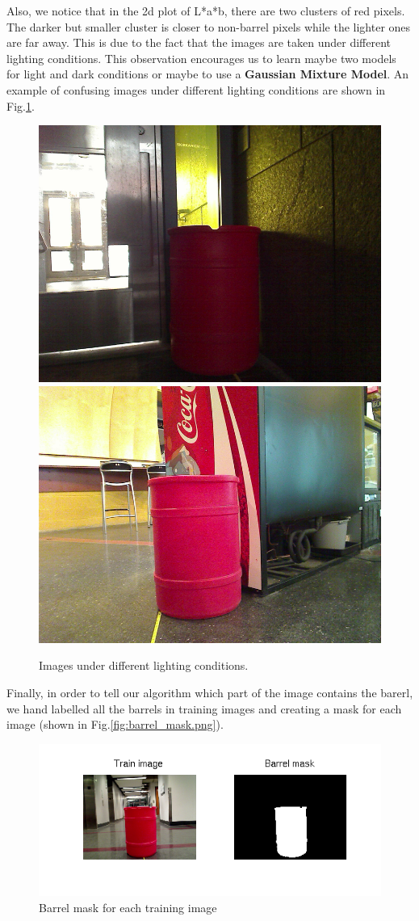 \documentclass[twoside]{article}
\begin{document}
\begin{multicols}{2}
Also, we notice that in the 2d plot of L*a*b, there are two clusters of red pixels. The darker but smaller cluster is closer to non-barrel pixels while the lighter ones are far away. This is due to the fact that the images are taken under different lighting conditions. This observation encourages us to learn maybe two models for light and dark conditions or maybe to use a \textbf{Gaussian Mixture Model}. An example of confusing images under different lighting conditions are shown in Fig.\ref{fig:confusing}.

\begin{figure}[H]
  \centering
  \includegraphics[width=0.4\columnwidth]{barrel_dark.png}
  \;\;\;
  \includegraphics[width=0.4\columnwidth]{barrel_red.png}
  \caption{Images under different lighting conditions. \label{fig:confusing}}
\end{figure}

Finally, in order to tell our algorithm which part of the image contains the barerl, we hand labelled all the barrels in training images and creating a mask for each image (shown in Fig.\ref{fig:barrel_mask.png}).

\begin{figure}[H]
  \centering
  \includegraphics[width=\columnwidth]{barrel_mask.png}
    \caption{Barrel mask for each training image}
    \label{fig:barrel_mask}
\end{figure}


\end{multicols}
\end{document}
